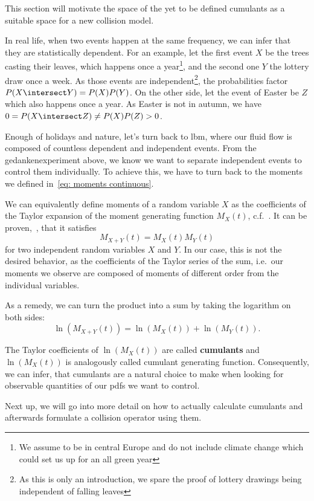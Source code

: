 
This section will motivate the space of the yet to be defined cumulants as a suitable space for a new collision model.

In real life, when two events happen at the same frequency, we can infer that they are statistically dependent.
For an example, let the first event $X$ be the trees casting their leaves, which happens once a year\footnote{We
assume to be in central Europe and do not include climate change which could set us up for an all green year},
and the second one $Y$ the lottery draw once a week.
As those events are independent\footnote{As
this is only an introduction, we spare the proof of lottery drawings being independent of falling leaves},
the probabilities factor $P(X\intersect Y) = P(X)P(Y)$.
On the other side, let the event of Easter be $Z$ which also happens once a year.
As Easter is not in autumn, we have $0 = P(X\intersect Z) \neq P(X)P(Z) > 0$.

Enough of holidays and nature, let's turn back to \gls{lbm}, where our fluid flow is composed of countless dependent and independent events.
From the gedankenexperiment above, we know we want to separate independent events to control them individually.
To achieve this, we have to turn back to the moments we defined in~\eqref{eq: moments continuous}.

We can equivalently define moments of a random variable $X$ as the coefficients of the Taylor expansion of the moment generating function $M_X(t)$, c.f.~\cite{weissteinMGF}.
It can be proven,~\cite{weissteinMGF}, that it satisfies
\begin{equation}
\label{eq: moment generating function for independent variables}
  M_{X+Y}(t) = M_{X}(t)M_{Y}(t)
\end{equation}
for two independent random variables $X$ and $Y$.
In our case, this is not the desired behavior, as the coefficients of the Taylor series of the sum, i.e.\ our moments we observe are composed of moments of different order from the individual variables.

As a remedy, we can turn the product into a sum by taking the logarithm on both sides:
\begin{equation}
  \label{eq: cumulant generating function for independent variables}
  \ln(M_{X+Y}(t)) = \ln(M_{X}(t)) + \ln(M_{Y}(t)).
\end{equation}

The Taylor coefficients of $\ln(M_X(t))$ are called \textbf{cumulants} and $\ln(M_{X}(t))$ is analogously called cumulant generating function.
Consequently, we can infer, that cumulants are a natural choice to make when looking for observable quantities of our \glspl{pdf} we want to control.

Next up, we will go into more detail on how to actually calculate cumulants and afterwards formulate a collision operator using them.
